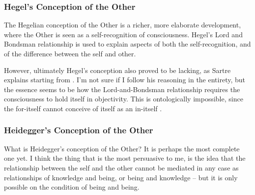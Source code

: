 \subsubsection*{Hegel's Conception of the Other}

The Hegelian conception of the Other \autocite[325 -- 328]{sartre} is a richer, more elaborate development, where the Other is seen as a self-recognition of consciousness. Hegel's Lord and Bondsman relationship is used to explain aspects of both the self-recognition, and of the difference between the self and other.

However, ultimately Hegel's conception also proved to be lacking, as Sartre explains starting from \autocite[329]{sartre}. I'm not sure if I follow his reasoning in the entirety, but the essence seems to be how the Lord-and-Bondsman relationship requires the consciousness to hold itself in objectivity. This is ontologically impossible, since the for-itself cannot conceive of itself as an in-itself \autocite[334]{sartre}.

\subsubsection*{Heidegger's Conception of the Other}

What is Heidegger's conception of the Other? It is perhaps the most complete one yet. I think the thing that is the most persuasive to me, is the idea that the relationship between the self and the other cannot be mediated in any case as relationships of knowledge and being, or being and knowledge -- but it is only possible on the condition of being and being.

